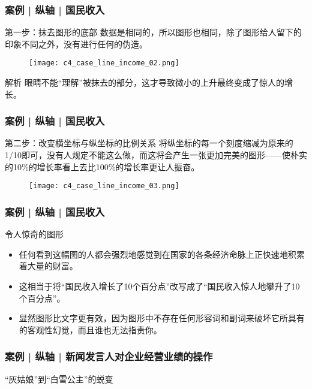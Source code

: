 \begin{frame}
  \frametitle{案例 | 纵轴 | 国民收入}
  \begin{block}{第一步：抹去图形的底部}
    数据是相同的，所以图形也相同，除了图形给人留下的印象不同之外，没有进行任何的伪造。
  \end{block}
  \vspace{-0.5em}
  \begin{figure}
    \centering
    \texttt{[image: c4\_case\_line\_income\_02.png]}
  \end{figure}
  \pause
  \vspace{-0.5em}
  \begin{block}{解析}
    眼睛不能“理解”被抹去的部分，这才导致微小的上升最终变成了惊人的增长。
  \end{block}
\end{frame}

\begin{frame}
  \frametitle{案例 | 纵轴 | 国民收入}
  \begin{block}{第二步：改变横坐标与纵坐标的比例关系}
    将纵坐标的每一个刻度缩减为原来的1/10即可，没有人规定不能这么做，而这将会产生一张更加完美的图形——使朴实的10\%的增长率看上去比100\%的增长率更让人振奋。
  \end{block}
  \vspace{-0.5em}
  \begin{figure}
    \centering
    \texttt{[image: c4\_case\_line\_income\_03.png]}
  \end{figure}
\end{frame}

\begin{frame}
  \frametitle{案例 | 纵轴 | 国民收入}
  \begin{block}{令人惊奇的图形}
    \begin{itemize}
      \item 任何看到这幅图的人都会强烈地感觉到在国家的各条经济命脉上正快速地积累着大量的财富。
      \item 这相当于将“国民收入增长了10个百分点”改写成了“国民收入惊人地攀升了10个百分点”。
      \item 显然图形比文字更有效，因为图形中不存在任何形容词和副词来破坏它所具有的客观性幻觉，而且谁也无法指责你。
    \end{itemize}
  \end{block}
\end{frame}

\begin{frame}
  \frametitle{案例 | 纵轴 | 新闻发言人对企业经营业绩的操作}
  \begin{block}{“灰姑娘”到“白雪公主”的蜕变}
    \begin{figure}
      \centering
    \end{figure}
  \end{block}
\end{frame}

